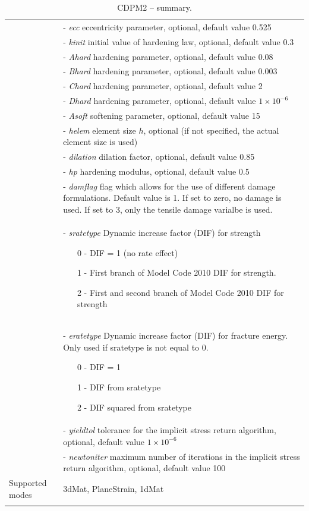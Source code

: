 \documentclass[a4paper]{article}
\newcommand{\param}[1]{{\it #1}}
\begin{document}
\begin{longtable}{|l|p{9cm}|}
&- \param{ecc} eccentricity parameter, optional, default value 0.525\\
&- \param{kinit} initial value of hardening law, optional, default value 0.3\\
&- \param{Ahard} hardening parameter, optional, default value 0.08\\
&- \param{Bhard} hardening parameter, optional, default value 0.003\\
&- \param{Chard} hardening parameter, optional, default value 2\\
&- \param{Dhard} hardening parameter, optional, default value $1\times 10^{-6}$\\
&- \param{Asoft} softening parameter, optional, default value 15\\
&- \param{helem} element size $h$, optional (if not specified, the actual element size is used)\\
&- \param{dilation} dilation factor, optional, default value 0.85\\
&- \param{hp} hardening modulus, optional, default value 0.5\\
&- \param{damflag} flag which allows for the use of different damage formulations. Default value is 1. If set to zero, no damage is used. If set to 3, only the tensile damage varialbe is used.\\
&- \param{sratetype}  Dynamic increase factor (DIF) for strength
\begin{itemize}\setlength{\itemsep}{-3pt}
\item[0 -] DIF = 1  (no rate effect)
\item[1 -] First branch of Model Code 2010 DIF for strength.
\item[2 -] First and second branch of Model Code 2010 DIF for strength
\end{itemize}\\
&- \param{eratetype} Dynamic increase factor (DIF) for fracture energy. Only used if sratetype is not equal to 0. 
\begin{itemize}\setlength{\itemsep}{-3pt}
\item[0 -] DIF = 1
\item[1 -] DIF from sratetype  
\item[2 -] DIF squared from sratetype
\end{itemize}\\
&- \param{yieldtol} tolerance for the implicit stress return algorithm, optional, default value $1 \times 10^{-6}$\\
&- \param{newtoniter} maximum number of iterations in the implicit stress return algorithm, optional, default value 100\\
Supported modes& 3dMat, PlaneStrain, 1dMat\\
\hline
\caption{CDPM2 -- summary.}
\label{cdpm2_table}
\end{longtable}
\end{document}

